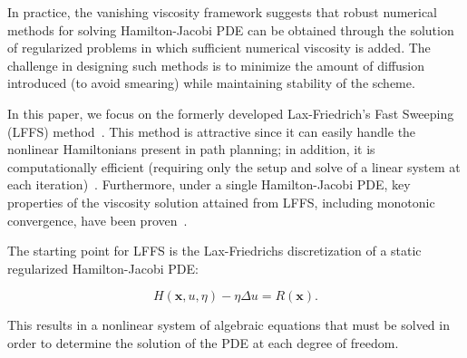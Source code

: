 \documentclass[pdflatex,sn-mathphys-num]{sn-jnl}%
\def \bx{{\mathbf {x}}}
\theoremstyle{thmstyleone}%
\theoremstyle{thmstyletwo}%
\theoremstyle{thmstylethree}%
\begin{document}
In practice, the vanishing viscosity framework suggests that robust numerical methods for solving Hamilton-Jacobi PDE can be obtained through the solution of regularized problems in which sufficient numerical viscosity is added.  The challenge in designing such methods is to minimize the amount of diffusion introduced (to avoid smearing) while maintaining stability of the scheme.

In this paper, we focus on the formerly developed Lax-Friedrich's Fast Sweeping (LFFS) method~\cite{Kao2004, Zhao2004}.  This method is attractive since it can easily handle the nonlinear Hamiltonians present in path planning; in addition, it is computationally efficient (requiring only the setup and solve of a linear system at each iteration)~\cite{Chen2013}.  Furthermore, under a single Hamilton-Jacobi PDE, key properties of the viscosity solution attained from LFFS, including monotonic convergence, have been proven~\cite{Zhao2004}. 


The starting point for LFFS is the Lax-Friedrichs discretization of a static regularized Hamilton-Jacobi PDE:

\begin{equation}
    H(\bx,u,\eta) - \eta \Delta u = R(\bx).
\end{equation}

This results in a nonlinear system of algebraic equations that must be solved in order to determine the solution of the PDE at each degree of freedom.  
\end{document}
